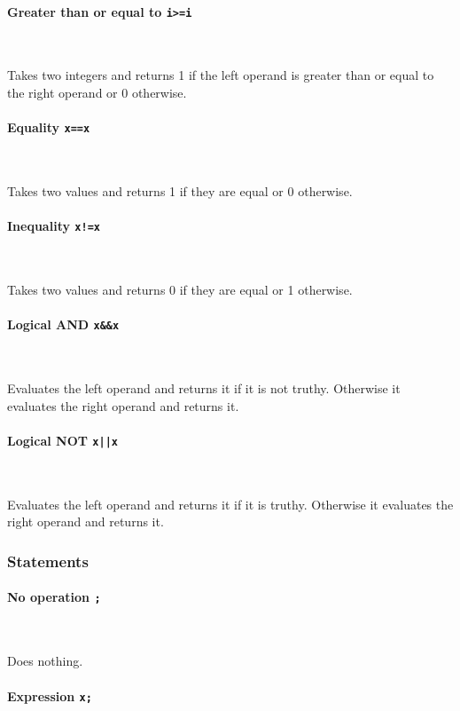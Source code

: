 \paragraph{Greater than or equal to \quad \texttt{i>=i}} \

Takes two integers and returns 1 if the left operand is greater than or equal to the right operand or 0 otherwise.

\paragraph{Equality \quad \texttt{x==x}} \

Takes two values and returns 1 if they are equal or 0 otherwise.

\paragraph{Inequality \quad \texttt{x!=x}} \

Takes two values and returns 0 if they are equal or 1 otherwise.

\paragraph{Logical AND \quad \texttt{x\&\&x}} \

Evaluates the left operand and returns it if it is not truthy. Otherwise it evaluates the right operand and returns it.

\paragraph{Logical NOT \quad \texttt{x||x}} \

Evaluates the left operand and returns it if it is truthy. Otherwise it evaluates the right operand and returns it.

\subsubsection{Statements}

\paragraph{No operation \quad \texttt{;}} \

Does nothing.

\paragraph{Expression \quad \texttt{x;}} \

